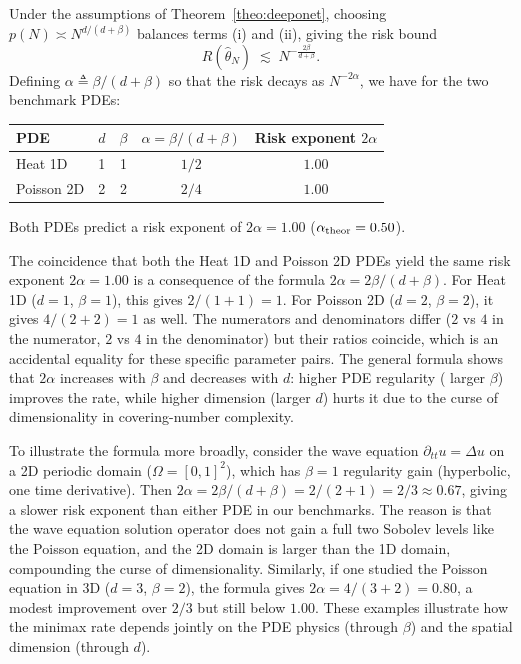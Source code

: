 \documentclass[12pt,a4paper]{article}
\begin{document}
\begin{coro}
    \label{cor:rates}
    Under the assumptions of Theorem~\ref{theo:deeponet},
    choosing $p(N) \asymp N^{d/(d+\beta)}$ balances terms (i) and (ii),
    giving the risk bound
    \begin{equation}
        R(\hat\theta_N) \;\lesssim\; N^{-\frac{2\beta}{d+\beta}} .
        \label{eq:rate_N}
    \end{equation}
    Defining $\alpha \triangleq \beta/(d+\beta)$ so that the risk decays as
    $N^{-2\alpha}$, we have for the two benchmark PDEs:
    \begin{center}
        \begin{tabular}{lcccc}
            \toprule
            PDE & $d$ & $\beta$ & $\alpha = \beta/(d+\beta)$ & Risk exponent $2\alpha$ \\
            \midrule
            Heat 1D       & 1 & 1 & $1/2$   & $1.00$ \\
            Poisson 2D    & 2 & 2 & $2/4$   & $1.00$ \\
            \bottomrule
        \end{tabular}
    \end{center}
    Both PDEs predict a risk exponent of $2\alpha = 1.00$
    ($\alpha_{\rm theor} = 0.50$).
    \label{tab:rates}
\end{coro}

The coincidence that both the Heat 1D and Poisson 2D PDEs yield the same risk
exponent $2\alpha = 1.00$ is a consequence of the formula $2\alpha = 2\beta/(d+\beta)$.
For Heat 1D ($d=1$, $\beta=1$), this gives $2/(1+1) = 1$.  For Poisson 2D ($d=2$, $\beta=2$),
it gives $4/(2+2) = 1$ as well.  The numerators and denominators differ ($2$ vs $4$ in the
numerator, $2$ vs $4$ in the denominator) but their ratios coincide, which is an
accidental equality for these specific parameter pairs.  The general formula shows
that $2\alpha$ increases with $\beta$ and decreases with $d$: higher PDE regularity
( larger $\beta$) improves the rate, while higher dimension (larger $d$) hurts it
due to the curse of dimensionality in covering-number complexity.

To illustrate the formula more broadly, consider the wave equation
$\partial_{tt} u = \Delta u$ on a 2D periodic domain ($\Omega=[0,1]^2$), which
has $\beta=1$ regularity gain (hyperbolic, one time derivative).  Then
$2\alpha = 2\beta/(d+\beta) = 2/(2+1) = 2/3 \approx 0.67$, giving a slower risk
exponent than either PDE in our benchmarks.  The reason is that the wave equation
solution operator does not gain a full two Sobolev levels like the Poisson equation,
and the 2D domain is larger than the 1D domain, compounding the curse of
dimensionality.  Similarly, if one studied the Poisson equation in 3D ($d=3$, $\beta=2$),
the formula gives $2\alpha = 4/(3+2) = 0.80$, a modest improvement over $2/3$ but still
below $1.00$.  These examples illustrate how the minimax rate depends jointly on the
PDE physics (through $\beta$) and the spatial dimension (through $d$).
\end{document}
